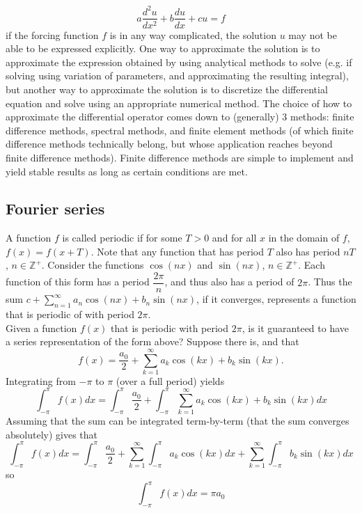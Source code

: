 \documentclass[11pt]{amsart}
\begin{document}
 \begin{equation*}
 a\dfrac{d^2u}{dx^2} + b\dfrac{du}{dx}+cu = f
 \end{equation*}
  if the forcing function $f$ is in any way complicated, the solution $u$ may not be able to be expressed explicitly. 
  One way to approximate the solution is to approximate the expression obtained by using analytical methods to solve (e.g. if solving using variation of parameters, and approximating the resulting integral), but another way to approximate the solution is to discretize the differential equation and solve using an appropriate numerical method. 
The choice of how to approximate the differential operator comes down to (generally) 3 methods: finite difference methods, spectral methods, and finite element methods (of which finite difference methods technically belong, but whose application reaches beyond finite difference methods). 
Finite difference methods are simple to implement and yield stable results as long as certain conditions are met.
  
  
 
 
 
 
 \subsection{Fourier series} 
 
 
 A function $f$ is called periodic if for some $T>0$ and for all $x$ in the domain of $f$, $f(x)=f(x+T)$.
 Note that any function that has period $T$ also has period $nT$, $n \in \mathbb{Z}^{+}$.
 Consider the functions $\cos(nx)$ and $\sin(nx)$, $n\in \mathbb{Z}^{+}$.  Each function of this form has a period $\dfrac{2\pi}{n}$, and thus also has a period of $2\pi $. 
Thus the sum $c+\sum_{n=1}^{\infty} a_n \cos(nx) + b_n \sin(nx)$, if it converges, represents a function that is periodic of with period $2\pi$. \\
Given a function $f(x)$ that is periodic with period $2\pi$, is it guaranteed to have a series representation of the form above? 
Suppose there is, and that
\begin{equation}
\label{eqn:Fourier}
f(x)=\dfrac{a_0}{2}+\sum_{k=1}^{\infty} a_k \cos(kx)+b_k \sin(kx).
\end{equation}
Integrating from $-\pi$ to $\pi$ (over a full period) yields
\begin{equation}
\int_{-\pi}^{\pi}f(x)dx=\int_{-\pi}^{\pi} \frac{a_0}{2} + \int_{-\pi}^{\pi} \sum_{k=1}^{\infty} a_k \cos(kx)+b_k \sin(kx)dx
\end{equation}
Assuming that the sum can be integrated term-by-term (that the sum converges absolutely) gives that
\begin{equation}
\int_{-\pi}^{\pi}f(x)dx=\int_{-\pi}^{\pi} \frac{a_0}{2} + \sum_{k=1}^{\infty}\int_{-\pi}^{\pi}  a_k \cos(kx)dx+ \sum_{k=1}^{\infty}\int_{-\pi}^{\pi} b_k \sin(kx)dx
\end{equation}
so 
\begin{equation}
\int_{-\pi}^{\pi} f(x)dx= \pi a_0
\end{equation}
\end{document}
